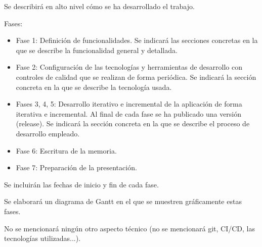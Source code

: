 
Se describirá en alto nivel cómo se ha desarrollado el trabajo.

Fases:

\begin{itemize}
    \item Fase 1: Definición de funcionalidades. Se indicará las secciones concretas en la que se describe la funcionalidad general y detallada.

    \item Fase 2: Configuración de las tecnologías y herramientas de desarrollo con controles de calidad que se realizan de forma periódica. Se indicará la sección concreta en la que se describe la tecnología usada.

    \item Fases 3, 4, 5: Desarrollo iterativo e incremental de la aplicación de forma iterativa e incremental. Al final de cada fase se ha publicado una versión (release). Se indicará la sección concreta en la que se describe el proceso de desarrollo empleado.

    \item Fase 6: Escritura de la memoria.

    \item Fase 7: Preparación de la presentación.
\end{itemize}

Se incluirán las fechas de inicio y fin de cada fase.

Se elaborará un diagrama de Gantt en el que se muestren gráficamente estas fases.

No se mencionará ningún otro aspecto técnico (no se mencionará git, CI/CD, las tecnologías utilizadas...).
